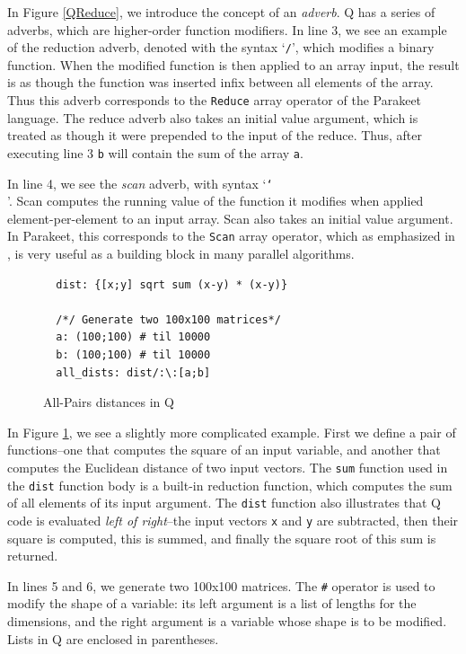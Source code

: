 \documentclass[preprint]{sigplanconf}
\begin{document}
In Figure \ref{QReduce}, we introduce the concept of an \emph{adverb}.  Q has a
series of adverbs, which are higher-order function modifiers.  In
line 3, we see an example of the reduction adverb, denoted with the syntax
`\texttt{/}', which modifies a binary function. When the modified function is
then applied to an array input, the result is as though the function was
inserted infix between all elements of the array.  Thus this adverb corresponds
to the \texttt{Reduce} array operator of the Parakeet language.  The reduce
adverb also takes an initial value argument, which is treated as though it were
prepended to the input of the reduce.  Thus, after executing line 3 \texttt{b}
will contain the sum of the array \texttt{a}.

In line 4, we see the \emph{scan} adverb, with syntax `\texttt{\char`\\}'.
Scan computes the running value of the function it modifies when applied
element-per-element to an input array. Scan also takes an initial value
argument.  In Parakeet, this corresponds to the \texttt{Scan} array operator,
which as emphasized in \cite{Blel90}, is very useful as a building block in many
parallel algorithms.

\begin{figure}[h!]

  \begin{lstlisting}
  dist: {[x;y] sqrt sum (x-y) * (x-y)}

  /*/ Generate two 100x100 matrices*/
  a: (100;100) # til 10000
  b: (100;100) # til 10000
  all_dists: dist/:\:[a;b]
  \end{lstlisting}
  \caption{All-Pairs distances in Q}
  \label{QAllPairsDist}
\end{figure}

In Figure \ref{QAllPairsDist}, we see a slightly more complicated example.
First we define a pair of functions--one that computes the square of an input
variable, and another that computes the Euclidean distance of two input
vectors.  The \texttt{sum} function used in the \texttt{dist} function body is a
built-in reduction function, which computes the sum of all elements of its input
argument.  The \texttt{dist} function also illustrates that Q code is evaluated
\emph{left of right}--the input vectors \texttt{x} and \texttt{y} are
subtracted, then their square is computed, this is summed, and finally the
square root of this sum is returned.

In lines 5 and 6, we generate two 100x100 matrices.  The \texttt{\#} operator is
used to modify the shape of a variable: its left argument is a list of lengths
for the dimensions, and the right argument is a variable whose shape is to be
modified.  Lists in Q are enclosed in parentheses.
\end{document}
